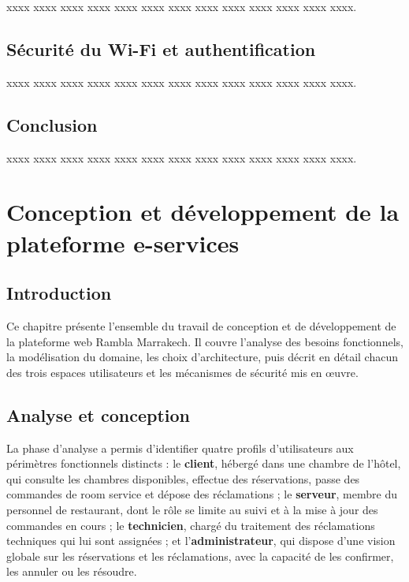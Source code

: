 \documentclass[12pt,a4paper]{report}
\begin{document}
xxxx xxxx xxxx xxxx xxxx xxxx xxxx xxxx xxxx xxxx xxxx xxxx xxxx.

\section{Sécurité du Wi-Fi et authentification}

xxxx xxxx xxxx xxxx xxxx xxxx xxxx xxxx xxxx xxxx xxxx xxxx xxxx.

\section{Conclusion}

xxxx xxxx xxxx xxxx xxxx xxxx xxxx xxxx xxxx xxxx xxxx xxxx xxxx.


\chapter{Conception et développement de la plateforme e-services}

\section{Introduction}

Ce chapitre présente l'ensemble du travail de conception et de développement
de la plateforme web Rambla Marrakech. Il couvre l'analyse des besoins
fonctionnels, la modélisation du domaine, les choix d'architecture, puis
décrit en détail chacun des trois espaces utilisateurs et les mécanismes de
sécurité mis en \oe uvre.

\section{Analyse et conception}

La phase d'analyse a permis d'identifier quatre profils d'utilisateurs aux
périmètres fonctionnels distincts : le \textbf{client}, hébergé dans une
chambre de l'hôtel, qui consulte les chambres disponibles, effectue des
réservations, passe des commandes de room service et dépose des
réclamations ; le \textbf{serveur}, membre du personnel de restaurant,
dont le rôle se limite au suivi et à la mise à jour des commandes en cours ;
le \textbf{technicien}, chargé du traitement des réclamations techniques
qui lui sont assignées ; et l'\textbf{administrateur}, qui dispose d'une
vision globale sur les réservations et les réclamations, avec la capacité
de les confirmer, les annuler ou les résoudre.
\end{document}
